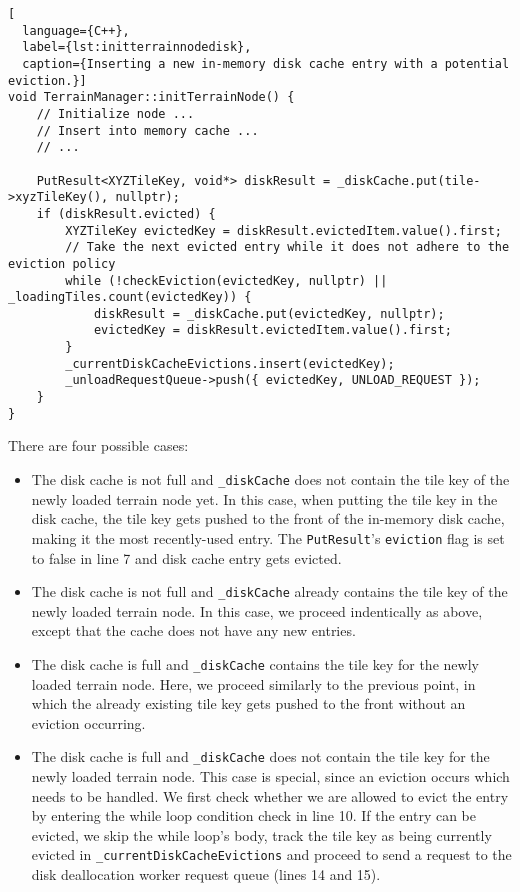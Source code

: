 \begin{lstlisting}[
  language={C++},
  label={lst:initterrainnodedisk},
  caption={Inserting a new in-memory disk cache entry with a potential eviction.}]
void TerrainManager::initTerrainNode() {
    // Initialize node ... 
    // Insert into memory cache ...
    // ... 

    PutResult<XYZTileKey, void*> diskResult = _diskCache.put(tile->xyzTileKey(), nullptr);
    if (diskResult.evicted) {
        XYZTileKey evictedKey = diskResult.evictedItem.value().first;
        // Take the next evicted entry while it does not adhere to the eviction policy
        while (!checkEviction(evictedKey, nullptr) || _loadingTiles.count(evictedKey)) {
            diskResult = _diskCache.put(evictedKey, nullptr);
            evictedKey = diskResult.evictedItem.value().first;
        }
        _currentDiskCacheEvictions.insert(evictedKey);
        _unloadRequestQueue->push({ evictedKey, UNLOAD_REQUEST });
    }
}
\end{lstlisting}
There are four possible cases:
\begin{itemize}
  \item The disk cache is not full and \texttt{\_diskCache} does not contain 
  the tile key of the newly loaded terrain node yet.
  In this case, 
        when putting the tile key in the disk cache, the tile key 
        gets pushed to the front of the in-memory disk cache, making it the most 
        recently-used entry. The \texttt{PutResult}'s \texttt{eviction} flag is 
        set to false in line 7 and disk cache entry gets evicted.
  \item The disk cache is not full and \texttt{\_diskCache} already contains 
        the tile key of the newly loaded terrain node. 
        In this case,
        we proceed indentically as above, except that the cache does not
        have any new entries.
  \item The disk cache is full and \texttt{\_diskCache} contains 
        the tile key for the newly loaded terrain node. 
        Here, we proceed similarly to the previous point, 
        in which the already existing tile key gets pushed 
        to the front without an eviction occurring.
  \item The disk cache is full and \texttt{\_diskCache}
        does not contain the tile key for the newly loaded terrain node. 
        This case is special, since an eviction occurs which needs to 
        be handled. We first check whether we are allowed to 
        evict the entry by entering the while loop condition check
        in line 10. If the entry can be evicted, we skip 
        the while loop's body, track the tile key as being currently 
        evicted in \texttt{\_currentDiskCacheEvictions} and proceed to send 
        a request to the disk deallocation worker request queue (lines 14 and 15).
\end{itemize}

